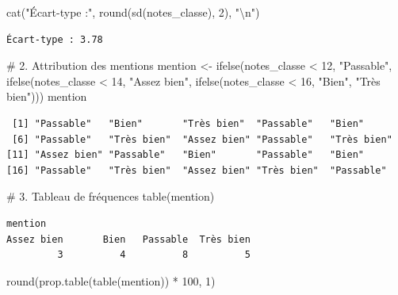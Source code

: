 \documentclass[
  french,
  11pt,
  a4paper,
]{article}
\newenvironment{Shaded}{}{}
\newcommand{\CommentTok}[1]{\textcolor[rgb]{0.42,0.45,0.49}{#1}}
\newcommand{\DecValTok}[1]{\textcolor[rgb]{0.00,0.36,0.77}{#1}}
\newcommand{\FunctionTok}[1]{\textcolor[rgb]{0.44,0.26,0.76}{#1}}
\newcommand{\NormalTok}[1]{\textcolor[rgb]{0.14,0.16,0.18}{#1}}
\newcommand{\OtherTok}[1]{\textcolor[rgb]{0.44,0.26,0.76}{#1}}
\newcommand{\SpecialCharTok}[1]{\textcolor[rgb]{0.00,0.36,0.77}{#1}}
\newcommand{\StringTok}[1]{\textcolor[rgb]{0.01,0.18,0.38}{#1}}
\begin{document}
\begin{Shaded}
\begin{Highlighting}[]
\FunctionTok{cat}\NormalTok{(}\StringTok{"Écart{-}type :"}\NormalTok{, }\FunctionTok{round}\NormalTok{(}\FunctionTok{sd}\NormalTok{(notes\_classe), }\DecValTok{2}\NormalTok{), }\StringTok{"}\SpecialCharTok{\textbackslash{}n}\StringTok{"}\NormalTok{)}
\end{Highlighting}
\end{Shaded}

\begin{verbatim}
Écart-type : 3.78 
\end{verbatim}

\begin{Shaded}
\begin{Highlighting}[]
\CommentTok{\# 2. Attribution des mentions}
\NormalTok{mention }\OtherTok{\textless{}{-}} \FunctionTok{ifelse}\NormalTok{(notes\_classe }\SpecialCharTok{\textless{}} \DecValTok{12}\NormalTok{, }\StringTok{"Passable"}\NormalTok{,}
           \FunctionTok{ifelse}\NormalTok{(notes\_classe }\SpecialCharTok{\textless{}} \DecValTok{14}\NormalTok{, }\StringTok{"Assez bien"}\NormalTok{,}
           \FunctionTok{ifelse}\NormalTok{(notes\_classe }\SpecialCharTok{\textless{}} \DecValTok{16}\NormalTok{, }\StringTok{"Bien"}\NormalTok{, }\StringTok{"Très bien"}\NormalTok{)))}
\NormalTok{mention}
\end{Highlighting}
\end{Shaded}

\begin{verbatim}
 [1] "Passable"   "Bien"       "Très bien"  "Passable"   "Bien"      
 [6] "Passable"   "Très bien"  "Assez bien" "Passable"   "Très bien" 
[11] "Assez bien" "Passable"   "Bien"       "Passable"   "Bien"      
[16] "Passable"   "Très bien"  "Assez bien" "Très bien"  "Passable"  
\end{verbatim}

\begin{Shaded}
\begin{Highlighting}[]
\CommentTok{\# 3. Tableau de fréquences}
\FunctionTok{table}\NormalTok{(mention)}
\end{Highlighting}
\end{Shaded}

\begin{verbatim}
mention
Assez bien       Bien   Passable  Très bien 
         3          4          8          5 
\end{verbatim}

\begin{Shaded}
\begin{Highlighting}[]
\FunctionTok{round}\NormalTok{(}\FunctionTok{prop.table}\NormalTok{(}\FunctionTok{table}\NormalTok{(mention)) }\SpecialCharTok{*} \DecValTok{100}\NormalTok{, }\DecValTok{1}\NormalTok{)}
\end{Highlighting}
\end{Shaded}
\end{document}
